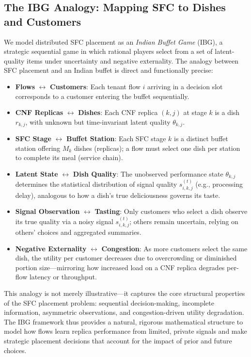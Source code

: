 \documentclass[journal]{IEEEtran}
\theoremstyle{plain}
\theoremstyle{definition}
\theoremstyle{remark}
\begin{document}
\subsection{The IBG Analogy: Mapping SFC to Dishes and Customers}
\label{sec:ibg_analogy}

We model distributed SFC placement as an \emph{Indian Buffet Game} (IBG), a strategic sequential game in which rational players select from a set of latent-quality items under uncertainty and negative externality. The analogy between SFC placement and an Indian buffet is direct and functionally precise:

\begin{itemize}
    \item \textbf{Flows} $\leftrightarrow$ \textbf{Customers}: Each tenant flow $i$ arriving in a decision slot corresponds to a customer entering the buffet sequentially.
    \item \textbf{CNF Replicas} $\leftrightarrow$ \textbf{Dishes}: Each CNF replica $(k,j)$ at stage $k$ is a dish $r_{k,j}$, with unknown but time-invariant latent quality $\theta_{k,j}$.
    \item \textbf{SFC Stage} $\leftrightarrow$ \textbf{Buffet Station}: Each SFC stage $k$ is a distinct buffet station offering $M_k$ dishes (replicas); a flow must select one dish per station to complete its meal (service chain).
    \item \textbf{Latent State} $\leftrightarrow$ \textbf{Dish Quality}: The unobserved performance state $\theta_{k,j}$ determines the statistical distribution of signal quality $s_{i,k,j}^{(t)}$ (e.g., processing delay), analogous to how a dish’s true deliciousness governs its taste.
    \item \textbf{Signal Observation} $\leftrightarrow$ \textbf{Tasting}: Only customers who select a dish observe its true quality via a noisy signal $s_{i,k,j}^{(t)}$; others remain uncertain, relying on others’ choices and aggregated summaries.
    \item \textbf{Negative Externality} $\leftrightarrow$ \textbf{Congestion}: As more customers select the same dish, the utility per customer decreases due to overcrowding or diminished portion size—mirroring how increased load on a CNF replica degrades per-flow latency or throughput.
\end{itemize}

This analogy is not merely illustrative—it captures the core structural properties of the SFC placement problem: sequential decision-making, incomplete information, asymmetric observations, and congestion-driven utility degradation. The IBG framework thus provides a natural, rigorous mathematical structure to model how flows learn replica performance from limited, private signals and make strategic placement decisions that account for the impact of prior and future choices.
\end{document}
